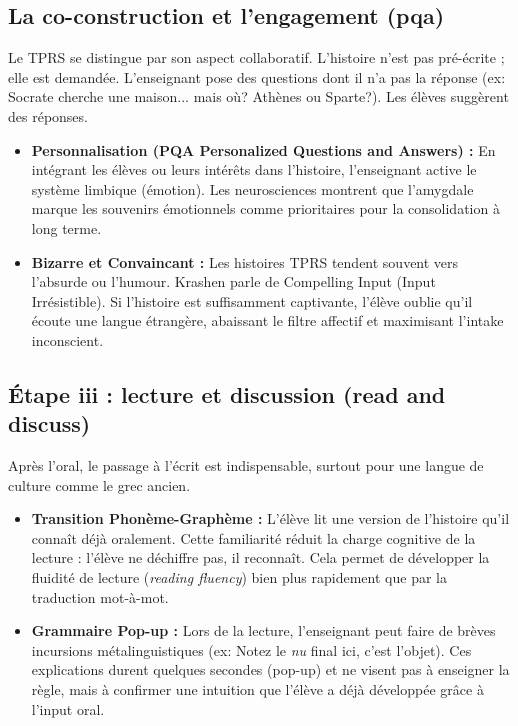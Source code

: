 \subsection{La co-construction et l'engagement (pqa)}

Le TPRS se distingue par son aspect collaboratif. L'histoire n'est pas pré-écrite ; elle est \og
demandée\fg{}. L'enseignant pose des questions dont il n'a pas la réponse (ex: \og Socrate cherche
une maison... mais où? Athènes ou Sparte?\fg{}). Les élèves suggèrent des réponses.

\begin{itemize}\item \textbf{Personnalisation (PQA \- Personalized Questions and Answers) :} En intégrant les élèves ou leurs intérêts dans l'histoire, l'enseignant active le système limbique (émotion). Les neurosciences montrent que l'amygdale marque les souvenirs émotionnels comme prioritaires pour la consolidation à long terme.\cite{III-2-3-ref17}\item \textbf{Bizarre et Convaincant :} Les histoires TPRS tendent souvent vers l'absurde ou l'humour. Krashen parle de \og Compelling Input\fg{} (Input Irrésistible). Si l'histoire est suffisamment captivante, l'élève \og oublie\fg{} qu'il écoute une langue étrangère, abaissant le filtre affectif et maximisant l'intake inconscient.\cite{III-2-3-ref3}\end{itemize}

\subsection{Étape iii : lecture et discussion (read and discuss)}

Après l'oral, le passage à l'écrit est indispensable, surtout pour une langue de culture comme le
grec ancien.

\begin{itemize}\item \textbf{Transition Phonème-Graphème :} L'élève lit une version de l'histoire qu'il connaît déjà oralement. Cette familiarité réduit la charge cognitive de la lecture : l'élève ne déchiffre pas, il reconnaît. Cela permet de développer la fluidité de lecture (\textit{reading fluency}) bien plus rapidement que par la traduction mot-à-mot.\cite{III-2-3-ref2}\item \textbf{Grammaire Pop-up :} Lors de la lecture, l'enseignant peut faire de brèves incursions métalinguistiques (ex: \og Notez le \textit{nu} final ici, c'est l'objet\fg{}). Ces explications durent quelques secondes (\og pop-up\fg{}) et ne visent pas à enseigner la règle, mais à confirmer une intuition que l'élève a déjà développée grâce à l'input oral.\cite{III-2-3-ref5}\end{itemize}


